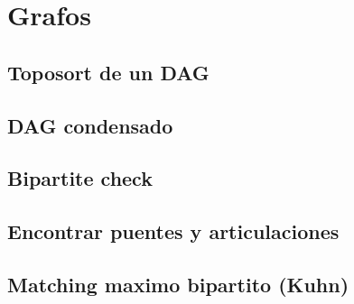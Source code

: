 \section{Grafos}
    \subsection{Toposort de un DAG}
    

    \subsection{DAG condensado}
    

    \subsection{Bipartite check}
    

    \subsection{Encontrar puentes y articulaciones}
    

    \subsection{Matching maximo bipartito (Kuhn)}
    


    